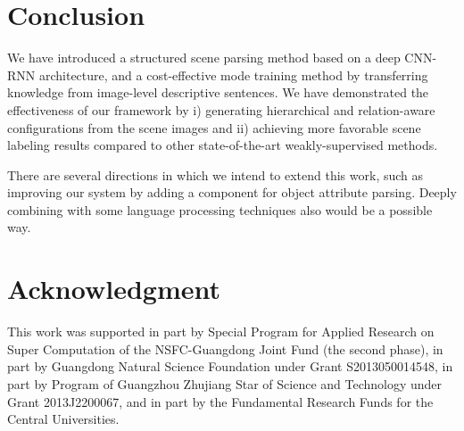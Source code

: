 \documentclass[10pt,twocolumn,letterpaper]{article}
\begin{document}
\section{Conclusion}

We have introduced a structured scene parsing method based on a deep CNN-RNN architecture, and a cost-effective mode training method by transferring knowledge from image-level descriptive sentences. We have demonstrated the effectiveness of our framework by i) generating hierarchical and relation-aware configurations from the scene images and ii) achieving more favorable scene labeling results compared to other state-of-the-art weakly-supervised methods.

There are several directions in which we intend to extend this work, such as improving our system by adding a component for object attribute parsing. Deeply combining with some language processing techniques also would be a possible way.

\section*{Acknowledgment}

This work was supported in part by Special Program for Applied Research on Super Computation of the NSFC-Guangdong Joint Fund (the second phase), in part by Guangdong Natural Science Foundation under Grant S2013050014548, in part by Program of Guangzhou Zhujiang Star of Science and Technology under Grant 2013J2200067, and in part by the Fundamental Research Funds for the Central Universities.


{\small


}
\end{document}
